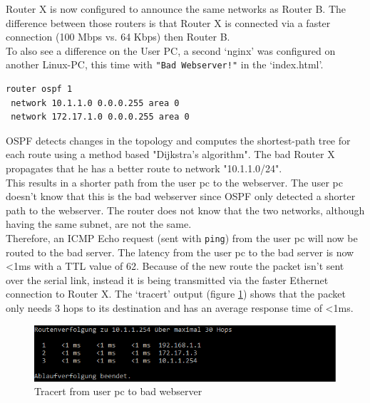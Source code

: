 Router X is now configured to announce the same networks as Router B. The difference between those routers is that Router X is connected via a faster connection (100 Mbps vs. 64 Kbps) then Router B. \\

To also see a difference on the User PC, a second `nginx' was configured on another Linux-PC, this time with \texttt{"Bad Webserver!"} in the `index.html'. 

\begin{lstlisting}[caption={\ac{OSPF} configuration on router X},label={lst:ospfRouterX},language={}]
router ospf 1
 network 10.1.1.0 0.0.0.255 area 0
 network 172.17.1.0 0.0.0.255 area 0
\end{lstlisting}

\ac{OSPF} detects changes in the topology and computes the shortest-path tree for each route using a method based "Dijkstra's algorithm". The bad Router X propagates that he has a better route to network "10.1.1.0/24". \\
This results in a shorter path from the user pc to the webserver. The user pc doesn't know that this is the bad webserver since \ac{OSPF} only detected a shorter path to the webserver. The router does not know that the two networks, although having the same subnet, are not the same. \\
Therefore, an ICMP Echo request (sent with \texttt{ping}) from the user pc will now be routed to the bad server.
The latency from the user pc to the bad server is now <1ms with a TTL value of 62. Because of the new route the packet isn't sent over the serial link, instead it is being transmitted via the faster Ethernet connection to Router X. The `tracert' output (figure \ref{img:TracertBadWebserver}) shows that the packet only needs 3 hops to its destination and has an average response time of <1ms.

\begin{figure}[H]
	\centering
	\includegraphics[width=1.0\textwidth]{img/TracertBadWebserver.png}
	\caption{Tracert from user pc to bad webserver}
	\label{img:TracertBadWebserver}
\end{figure}

